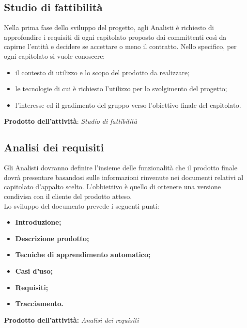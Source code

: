 \documentclass[11pt,a4paper]{article}
\begin{document}
	\subsection{Studio di fattibilità}
	Nella prima fase dello sviluppo del progetto, agli Analisti è richiesto di approfondire i requisiti di ogni capitolato proposto dai committenti così da capirne l'entità e decidere se accettare o meno il contratto. Nello specifico, per ogni capitolato si vuole conoscere:
	\begin{itemize}
		\item il contesto di utilizzo e lo scopo del prodotto da realizzare;
		\item le tecnologie di cui è richiesto l'utilizzo per lo svolgimento del progetto;
		\item l'interesse ed il gradimento del gruppo verso l'obiettivo finale del capitolato.
	\end{itemize}
	\textbf{Prodotto dell'attività}: \textit{Studio di fattibilità}
	
	\subsection{Analisi dei requisiti}
	Gli Analisti dovranno definire l'insieme delle funzionalità che il prodotto finale dovrà presentare basandosi sulle informazioni rinvenute nei documenti relativi al capitolato d'appalto scelto. L'obbiettivo è quello di ottenere una versione condivisa con il cliente del prodotto atteso.\\
	
	Lo sviluppo del documento prevede i seguenti punti:	
	\begin{itemize}
		\item \textbf{Introduzione;}
		\item \textbf{Descrizione prodotto;}
		\item \textbf{Tecniche di apprendimento automatico;}
		\item \textbf{Casi d'uso;}
		\item \textbf{Requisiti;}
		\item \textbf{Tracciamento.}
	\end{itemize}

	\textbf{Prodotto dell'attività:} \textit{Analisi dei requisiti}
	
\end{document}
